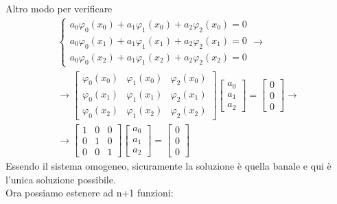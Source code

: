 \documentclass[a4paper, portrait]{book}
\numberwithin{equation}{chapter} %
\begin{document}
Altro modo per verificare
\begin{gather}
    \begin{cases}
        a_0\varphi_0(x_0) + a_1\varphi_1(x_0)+a_2 \varphi_2(x_0) = 0\\
        a_0\varphi_0(x_1) + a_1\varphi_1(x_1)+a_2 \varphi_2(x_1) = 0\\
        a_0\varphi_0(x_2) + a_1\varphi_1(x_2)+a_2 \varphi_2(x_2) = 0
    \end{cases} \longrightarrow\\
    \longrightarrow \begin{bmatrix}
        \varphi_0(x_0)&\varphi_1(x_0)&\varphi_2(x_0)\\
        \varphi_0(x_1)&\varphi_1(x_1)&\varphi_2(x_1)\\
        \varphi_0(x_2)&\varphi_1(x_2)&\varphi_2(x_2)
    \end{bmatrix}\begin{bmatrix}
        a_0\\a_1\\a_2
    \end{bmatrix} = \begin{bmatrix}
        0\\0\\0
    \end{bmatrix} \longrightarrow\\
    \longrightarrow \begin{bmatrix}
        1&0&0\\
        0&1&0\\
        0&0&1
    \end{bmatrix}\begin{bmatrix}
        a_0\\a_1\\a_2
    \end{bmatrix} = \begin{bmatrix}
        0\\0\\0
    \end{bmatrix}
\end{gather}
Essendo il sistema omogeneo, sicuramente la soluzione è quella banale e qui è l'unica soluzione possibile.\\
Ora possiamo estenere ad n+1 funzioni:
\end{document}
